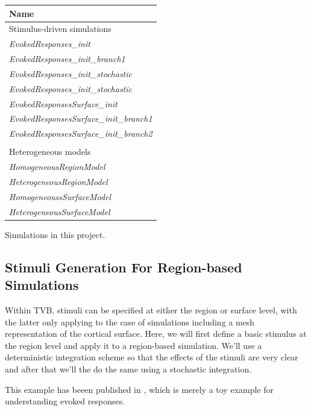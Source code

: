 \documentclass{tufte-handout}
\begin{document}
\begin{margintable}
  \centering
  \selectfont
  \begin{tabular}{l}
    \toprule
    Name \\
    \midrule
    \multicolumn{1}{l}{Stimulus-driven simulations}\\
    \textit{EvokedResponses\_init} \\
    \textit{EvokedResponses\_init\_branch1}  \\ 
    \textit{EvokedResponses\_init\_stochastic}  \\ 
    \textit{EvokedResponses\_init\_stochastic}  \\ 
     \textit{EvokedResponsesSurface\_init} \\
    \textit{EvokedResponsesSurface\_init\_branch1} \\
     \textit{EvokedResponsesSurface\_init\_branch2} \\
     \\
         \multicolumn{1}{l}{Heterogeneous models}\\
     \textit{HomogeneousRegionModel}\\
     \textit{HeterogeneousRegionModel} \\
     \textit{HomogeneoussSurfaceModel}\\
     \textit{HeterogeneousSurfaceModel}\\
    \bottomrule
  \end{tabular}
  \caption{Simulations in this project.}
  \label{tab:normaltab}
\end{margintable}

\subsection{Stimuli Generation For Region-based Simulations}\label{sec:region_stim}

Within TVB, stimuli can be specified at either the region or surface level,
with the latter only applying to the case of simulations including a mesh
representation of the cortical surface. Here, we will first define a basic
stimulus at the region level and apply it to a region-based simulation. We'll
use a deterministic integration scheme so that the effects of the stimuli are
very clear and after that  we'll the do the same using a stochastic
integration. 

This example has beeen published in \citep{Sanz-Leon_2013}, which is merely a
toy example for understanding evoked responses.
\end{document}
